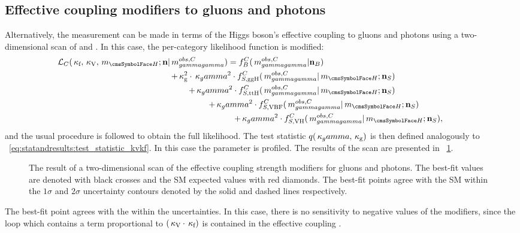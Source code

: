 \subsection{Effective coupling modifiers to gluons and photons}
Alternatively, the measurement can be made in terms of the Higgs boson's effective coupling to gluons and photons using a two-dimensional \DNLL scan of \kGlu and \kPho. In this case, the per-category likelihood function is modified:
\begin{equation}
\label{eq:statandresults:likelihood_function_muProc}
\begin{split} \mathcal{L}_C(\kf,\kV, \mH; \mathbf{n} | \mgg^{obs,C} ) = f^C_B(\mgg^{obs,C} | \mathbf{n}_B )\hspace{6cm}  \\ 
+ \kGlu^2\cdot \kPho^2 \cdot  f^C_{S,{\text{ggH}}}(\mgg^{obs,C} |\mH ; \mathbf{n}_S) \hspace{3cm} \\ 
+ \kPho^2 \cdot f^C_{S,{\text{ttH}}}(\mgg^{obs,C} |\mH ; \mathbf{n}_S) \hspace{3cm}  \\  
+ \kPho^2 \cdot  f^C_{S,{\text{VBF}}}(\mgg^{obs,C} |\mH ; \mathbf{n}_S) \hspace{2cm} \\
+ \kPho^2 \cdot f^C_{S,{\text{VH}}}(\mgg^{obs,C} |\mH ; \mathbf{n}_S),  \hspace{1cm} \\  
\end{split} 
\end{equation}
and the usual procedure is followed to obtain the full likelihood. The \DNLL test statistic $q(\,\kappa_gamma,\,\kappa_\text{g})$ is then defined analogously to \Eq~\ref{eq:statandresults:test_statistic_kvkf}.
In this case the \mH parameter is profiled. The results of the \DNLL scan are presented in \Fig~\ref{fig:statandresults:kappa_plots_kgkp}.

\begin{figure}[ht!]
\centering
\caption{The result of a two-dimensional \DNLL scan of the effective coupling strength modifiers for gluons and photons. The best-fit values are denoted with black crosses and the SM expected values with red diamonds. The best-fit points agree with the SM within the $1\sigma$ and $2\sigma$ uncertainty contours denoted by the solid and dashed lines respectively.}
\label{fig:statandresults:kappa_plots_kgkp}
\end{figure}

The best-fit point agrees with the \SM within the uncertainties. In this case, there is no sensitivity to negative values of the modifiers, since the \Hgg loop which contains a term proportional to $(\,\kappa_\text{V}\cdot\,\kappa_\text{f})$ is contained in the effective coupling \kPho.

